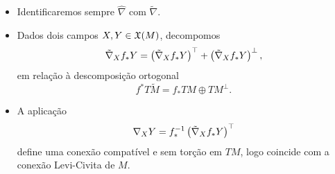 \documentclass[12pt,a4paper]{beamer}
\theoremstyle{definition}
\begin{document}
\begin{frame}

	\begin{itemize}
		\item Identificaremos sempre $\hat{\nabla}$ com $\tilde{\nabla}$.
		\pause
		\item 	Dados dois campos $X,Y \in \mathfrak{X}(M)$, decompomos
		\begin{equation*}
		\tilde{\nabla}_X f_* Y = \left( \tilde{\nabla}_X f_* Y \right)^\top + \left( \tilde{\nabla}_X f_* Y \right)^\perp,
		\end{equation*}  
		em relação à descomposição ortogonal
		\begin{equation*}
		f^* T \tilde{M} = f_* TM \oplus TM^\perp.
		\end{equation*}
		\pause
		\item 	A aplicação
		\begin{equation*}
		\nabla_X Y = f_*^{-1} \left( \tilde{\nabla}_X f_* Y \right)^\top
		\end{equation*}
		define uma conexão compatível e sem torção em $TM$, logo coincide com a conexão Levi-Civita de $M$.
	\end{itemize}
	
%	
%	

\end{frame}
\end{document}
